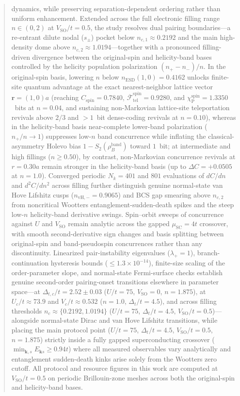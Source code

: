 \documentclass[aps,prb,twocolumn,superscriptaddress,longbibliography]{revtex4-2}
\begin{document}
\begin{abstract}
dynamics, while preserving separation-dependent ordering rather than uniform enhancement. Extended across the full electronic filling range $n \in (0,2)$ at $V_{\mathrm{SO}}/t=0.5$, the study resolves dual pairing boundaries---a re-entrant dilute nodal ($s_{\pm}$) pocket below $n_{c,1}\approx 0.2192$ and the main high-density dome above $n_{c,2}\approx 1.0194$---together with a pronounced filling-driven divergence between the original-spin and helicity-band bases controlled by the helicity population polarization $(n_+-n_-)/n$. In the original-spin basis, lowering $n$ below $n_{\mathrm{ESD}}(1,0)=0.4162$ unlocks finite-site quantum advantage at the exact nearest-neighbor lattice vector $\mathbf{r}=(1,0)a$ (reaching $C_{\mathrm{spin}}=0.7840$, $\overline{\mathcal{F}}_{\mathrm{tel}}^{\mathrm{spin}}=0.9280$, and $\chi_{\mathrm{P}}^{\mathrm{spin}}=1.3350$~bits at $n=0.04$, and sustaining non-Markovian lattice-site teleportation revivals above $2/3$ and $>1$~bit dense-coding revivals at $n=0.10$), whereas in the helicity-band basis near-complete lower-band polarization ($n_+/n \to 1$) suppresses low-$n$ band concurrence while inflating the classical-asymmetry Holevo bias $1-S_2(\rho_B^{\mathrm{band}})$ toward $1$~bit; at intermediate and high fillings ($n\ge 0.50$), by contrast, non-Markovian concurrence revivals at $r=0.30a$ remain stronger in the helicity-band basis (up to $\Delta C = +0.0505$ at $n=1.0$). Converged periodic $N_k=401$ and $801$ evaluations of $dC/dn$ and $d^2C/dn^2$ across filling further distinguish genuine normal-state van Hove Lifshitz cusps ($n_{\mathrm{vH},-}=0.9065$) and BCS gap smearing above $n_{c,2}$ from noncritical Wootters entanglement-sudden-death spikes and the steep low-$n$ helicity-band derivative swings. Spin--orbit sweeps of concurrence against $U$ and $V_{\mathrm{SO}}$ remain analytic across the gapped $\mu_{\mathrm{SC}}=4t$ crossover, with smooth second-derivative sign changes and basis splitting between original-spin and band-pseudospin concurrences rather than any discontinuity. Linearized pair-instability eigenvalues ($\lambda_+ = 1$), branch-continuation hysteresis bounds ($\le 1.3\times 10^{-14}$), finite-size scaling of the order-parameter slope, and normal-state Fermi-surface checks establish genuine second-order pairing-onset transitions elsewhere in parameter space---at $\Delta_{t,c}/t=2.52\pm 0.03$ ($U/t=75$, $V_{\mathrm{SO}}=0$, $n=1.875$), at $U_c/t\approx 73.9$ and $V_c/t\approx 0.532$ ($n=1.0$, $\Delta_t/t=4.5$), and across filling thresholds $n_c \approx \{0.2192, 1.0194\}$ ($U/t=75$, $\Delta_t/t=4.5$, $V_{\mathrm{SO}}/t=0.5$)---alongside normal-state Dirac and van Hove Lifshitz transitions, while placing the main protocol point ($U/t=75$, $\Delta_t/t=4.5$, $V_{\mathrm{SO}}/t=0.5$, $n=1.875$) strictly inside a fully gapped superconducting crossover ($\min_{\mathbf{k},s} E_{\mathbf{k}s} \ge 0.94t$) where all measured observables vary analytically and entanglement sudden-death kinks arise solely from the Wootters zero cutoff. All protocol and resource figures in this work are computed at $V_{\mathrm{SO}}/t=0.5$ on periodic Brillouin-zone meshes across both the original-spin and helicity-band bases.
\end{abstract}
\end{document}
